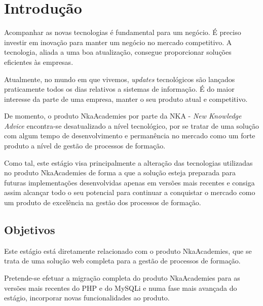 
\chapter{Introdução}


Acompanhar as novas tecnologias é fundamental para um negócio. É preciso investir em inovação para manter um negócio no mercado competitivo. A tecnologia, aliada a uma boa atualização, consegue proporcionar soluções eficientes às empresas.

Atualmente, no mundo em que vivemos, \textit{updates} tecnológicos são lançados praticamente todos os dias relativos a sistemas de informação. É do maior interesse da parte de uma empresa, manter o seu produto atual e competitivo.

De momento, o produto NkaAcademies por parte da NKA - \textit{New Knowledge Advice} encontra-se desatualizado a nível tecnológico, por se tratar de uma solução com algum tempo de desenvolvimento e permanência no mercado como um forte produto a nível de gestão de processos de formação.

Como tal, este estágio visa principalmente a alteração das tecnologias utilizadas no produto NkaAcademies de forma a que a solução esteja preparada para futuras implementações desenvolvidas apenas em versões mais recentes e consiga assim alcançar todo o seu potencial para continuar a conquistar o mercado como um produto de excelência na gestão dos processos de formação.



\section{Objetivos}


Este estágio está diretamente relacionado com o produto NkaAcademies, que se trata de uma solução web completa para a gestão de processos de formação.

Pretende-se efetuar a migração completa do produto NkaAcademies para as versões mais recentes do PHP e do MySQLi e numa fase mais avançada do estágio, incorporar novas funcionalidades ao produto.

